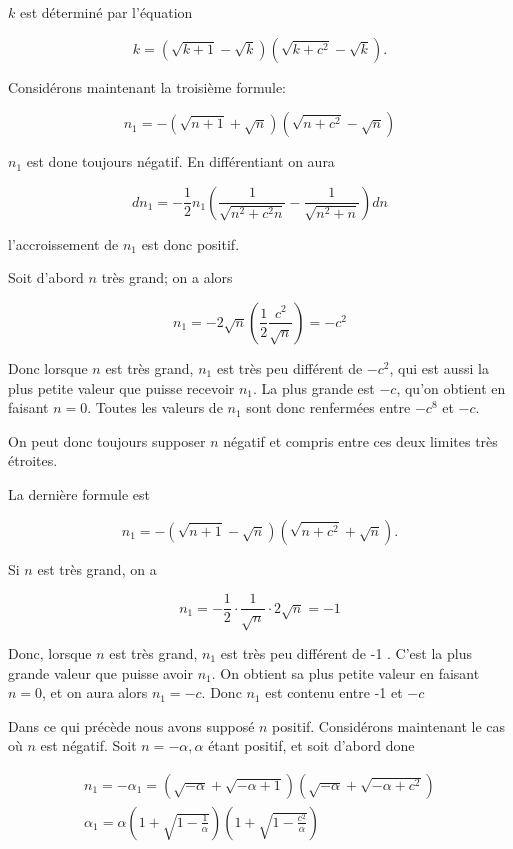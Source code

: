 \documentclass{article}
\begin{document}
\(k\) est déterminé par l'équation

\[
k=(\sqrt{k+1}-\sqrt{k})\left(\sqrt{k+c^{2}}-\sqrt{k}\right) .
\]

Considérons maintenant la troisième formule:

\[
n_{1}=-(\sqrt{n+1}+\sqrt{n})\left(\sqrt{n+c^{2}}-\sqrt{n}\right)
\]

\(n_{1}\) est done toujours négatif. En différentiant on aura

\[
d n_{1}=-\frac{1}{2} n_{1}\left(\frac{1}{\sqrt{n^{2}+c^{2} n}}-\frac{1}{\sqrt{n^{2}+n}}\right) d n
\]

l'accroissement de \(n_{1}\) est donc positif.

Soit d'abord \(n\) très grand; on a alors

\[
n_{1}=-2 \sqrt{n}\left(\frac{1}{2} \frac{c^{2}}{\sqrt{n}}\right)=-c^{2}
\]

Donc lorsque \(n\) est très grand, \(n_{1}\) est très peu différent de \(-c^{2}\), qui est aussi la plus petite valeur que puisse recevoir \(n_{1}\). La plus grande est \(-c\), qu'on obtient en faisant \(n=0\). Toutes les valeurs de \(n_{1}\) sont donc renfermées entre \(-c^{8}\) et \(-c\).

On peut donc toujours supposer \(n\) négatif et compris entre ces deux limites très étroites.

La dernière formule est

\[
n_{1}=-(\sqrt{n+1}-\sqrt{n})\left(\sqrt{n+c^{2}}+\sqrt{n}\right) .
\]

Si \(n\) est très grand, on a

\[
n_{1}=-\frac{1}{2} \cdot \frac{1}{\sqrt{n}} \cdot 2 \sqrt{n}=-1
\]

Donc, lorsque \(n\) est très grand, \(n_{1}\) est très peu différent de -1 . C'est la plus grande valeur que puisse avoir \(n_{1}\). On obtient sa plus petite valeur en faisant \(n=0\), et on aura alors \(n_{1}=-c\). Donc \(n_{1}\) est contenu entre -1 et \(-c\)

Dans ce qui précède nous avons supposé \(n\) positif. Considérons maintenant le cas où \(n\) est négatif. Soit \(n=-\alpha, \alpha\) étant positif, et soit d'abord done

\[
\begin{gathered}
n_{1}=-\alpha_{1}=(\sqrt{-\alpha}+\sqrt{-\alpha+1})\left(\sqrt{-\alpha}+\sqrt{-\alpha+c^{2}}\right) \\
\alpha_{1}=\alpha\left(1+\sqrt{1-\frac{1}{\alpha}}\right)\left(1+\sqrt{1-\frac{c^{2}}{\alpha}}\right)
\end{gathered}
\]
\end{document}
